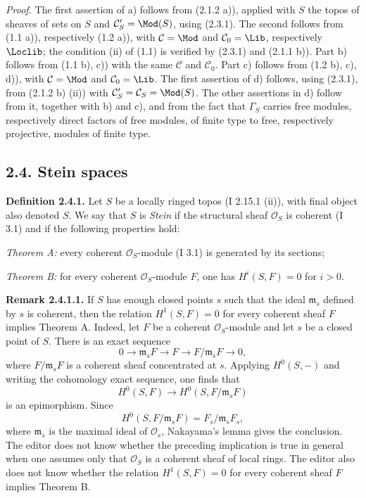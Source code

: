 \documentclass[11pt]{article}
\begin{document}
\emph{Proof.} The first assertion of a) follows from (2.1.2 a)), applied with $S$ the topos of sheaves of sets on $S$ and $\mathcal C'_S=\Mod(S)$, using (2.3.1). The second follows from (1.1 a)), respectively (1.2 a)), with $\mathcal C=\Mod$ and $\mathcal C_0=\Lib$, respectively $\Loclib$; the condition (ii) of (1.1) is verified by (2.3.1) and (2.1.1 b)). Part b) follows from (1.1 b), c)) with the same $\mathcal C$ and $\mathcal C_0$. Part c) follows from (1.2 b), c), d)), with $\mathcal C=\Mod$ and $\mathcal C_0=\Lib$. The first assertion of d) follows, using (2.3.1), from (2.1.2 b) (ii)) with $\mathcal C'_S=\mathcal C_S=\Mod(S)$. The other assertions in d) follow from it, together with b) and c), and from the fact that $\Gamma_S$ carries free modules, respectively direct factors of free modules, of finite type to free, respectively projective, modules of finite type.

\subsection*{2.4. Stein spaces}

\textbf{Definition 2.4.1.} Let $S$ be a locally ringed topos (I 2.15.1 (ii)), with final object also denoted $S$. We say that $S$ is \emph{Stein} if the structural sheaf $\mathcal O_S$ is coherent (I 3.1) and if the following properties hold:

\emph{Theorem A:} every coherent $\mathcal O_S$-module (I 3.1) is generated by its sections;

\emph{Theorem B:} for every coherent $\mathcal O_S$-module $F$, one has $H^i(S,F)=0$ for $i>0$.

\textbf{Remark 2.4.1.1.} If $S$ has enough closed points $s$ such that the ideal $\mathfrak m_s$ defined by $s$ is coherent, then the relation $H^1(S,F)=0$ for every coherent sheaf $F$ implies Theorem A. Indeed, let $F$ be a coherent $\mathcal O_S$-module and let $s$ be a closed point of $S$. There is an exact sequence
\[
0\longrightarrow \mathfrak m_sF\longrightarrow F\longrightarrow F/\mathfrak m_sF\longrightarrow0,
\]
where $F/\mathfrak m_sF$ is a coherent sheaf concentrated at $s$. Applying $H^0(S,-)$ and writing the cohomology exact sequence, one finds that
\[
H^0(S,F)\longrightarrow H^0(S,F/\mathfrak m_sF)
\]
is an epimorphism. Since
\[
H^0(S,F/\mathfrak m_sF)=F_s/\mathfrak m_sF_s,
\]
where $\mathfrak m_s$ is the maximal ideal of $\mathcal O_s$, Nakayama's lemma gives the conclusion. The editor does not know whether the preceding implication is true in general when one assumes only that $\mathcal O_S$ is a coherent sheaf of local rings. The editor also does not know whether the relation $H^1(S,F)=0$ for every coherent sheaf $F$ implies Theorem B.
\end{document}
